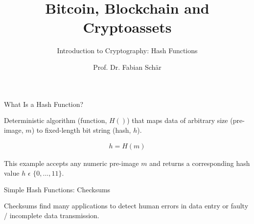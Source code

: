 \documentclass[handout]{beamer}
\title{Bitcoin, Blockchain and Cryptoassets}
\subtitle{Introduction to Cryptography: Hash Functions}
\author{Prof. Dr. Fabian Schär}
\institute{University of Basel}
\begin{document}
\thispagestyle{empty}
\begin{frame}[noframenumbering]
	\titlepage
\end{frame}

\begin{frame}{What Is a Hash Function?}

Deterministic algorithm (\color{focus}function, $H()$\color{black}) that maps data of arbitrary size (\color{focus}pre-image, $m$\color{black}) to fixed-length bit string (\color{focus}hash, $h$\color{black}).

	\begin{align}
		h = H(m)
		\label{eq:hash_function}
	\end{align}
	\vspace{1em}
	

This example accepts any numeric pre-image $m$ and returns a corresponding hash value $h$ $\epsilon$ $\{0,...,11\}$.
	
\end{frame}


\begin{frame}{Simple Hash Functions: Checksums}

Checksums find many applications to detect human errors in data entry or faulty / incomplete data transmission.

\vspace{1em} 
	
\end{frame}
\end{document}
